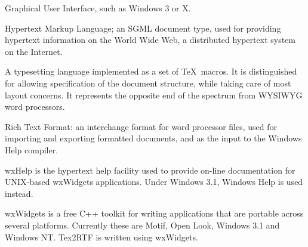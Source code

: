 \begin{helpglossary}
%
\setfooter{\thepage}{}{}{}{}{\thepage}%


Graphical User Interface, such as Windows 3 or X.

\label{html}

Hypertext Markup Language; an SGML document type, used for providing
hypertext information on the World Wide Web, a distributed hypertext
system on the Internet.

\label{latexgloss}

A typesetting language implemented as a set of \TeX\ macros. It is
distinguished for allowing specification of the document structure,
while taking care of most layout concerns. It represents the opposite
end of the spectrum from WYSIWYG word processors.

\label{rtf}

Rich Text Format: an interchange format for word processor files,
used for importing and exporting formatted documents, and as the
input to the Windows Help compiler.

\label{wxhelp}

wxHelp is the hypertext help facility used to provide on-line
documentation for UNIX-based wxWidgets applications. Under Windows 3.1,
Windows Help is used instead.

\label{wxwidgets}

wxWidgets is a free C++ toolkit for writing applications that are
portable across several platforms. Currently these are Motif, Open Look,
Windows 3.1 and Windows NT. Tex2RTF is written using wxWidgets.

\end{helpglossary}

%
\setfooter{\thepage}{}{}{}{}{\thepage}%
\printindex%


